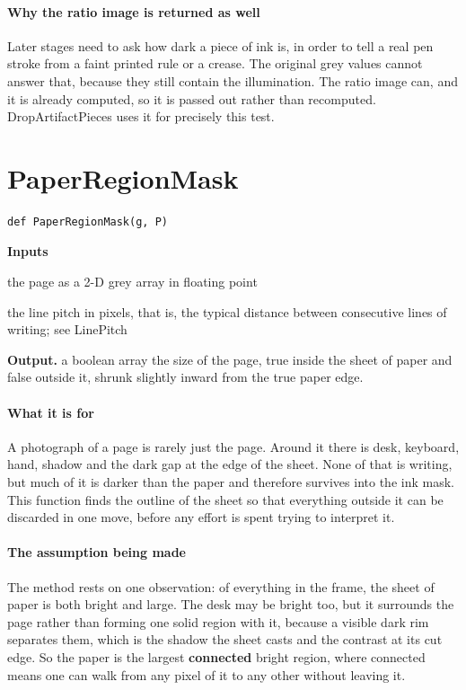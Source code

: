 \paragraph{Why the ratio image is returned as well}
Later stages need to ask how dark a piece of ink is, in order to tell a real pen stroke from a faint printed rule or a crease. The original grey values cannot answer that, because they still contain the illumination. The ratio image can, and it is already computed, so it is passed out rather than recomputed. DropArtifactPieces uses it for precisely this test.


\section{PaperRegionMask}
\begin{lstlisting}[style=sig]
def PaperRegionMask(g, P)
\end{lstlisting}

\noindent\textbf{Inputs}
\begin{description}[leftmargin=2.2em,style=nextline,font=\normalfont\ttfamily]\setlength\itemsep{1pt}
  \item[{g}] \normalfont the page as a 2-D grey array in floating point
  \item[{P}] \normalfont the line pitch in pixels, that is, the typical distance between consecutive lines of writing; see LinePitch
\end{description}

\noindent\textbf{Output.} a boolean array the size of the page, true inside the sheet of paper and false outside it, shrunk slightly inward from the true paper edge.


\paragraph{What it is for}
A photograph of a page is rarely just the page. Around it there is desk, keyboard, hand, shadow and the dark gap at the edge of the sheet. None of that is writing, but much of it is darker than the paper and therefore survives into the ink mask. This function finds the outline of the sheet so that everything outside it can be discarded in one move, before any effort is spent trying to interpret it.


\paragraph{The assumption being made}
The method rests on one observation: of everything in the frame, the sheet of paper is both bright and large. The desk may be bright too, but it surrounds the page rather than forming one solid region with it, because a visible dark rim separates them, which is the shadow the sheet casts and the contrast at its cut edge. So the paper is the largest \textbf{connected} bright region, where connected means one can walk from any pixel of it to any other without leaving it.


